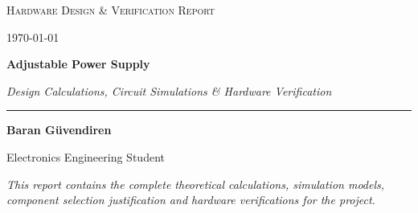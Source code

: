 \begin{titlepage}
    \centering
    
    \vspace*{3cm}
    {\scshape\Large Hardware Design \& Verification Report\par}
    {\small \today\par}

    \vspace{2.25cm}
    {\huge\bfseries Adjustable Power Supply\par}
    {\Large\itshape Design Calculations, Circuit Simulations \& Hardware Verification\par}
    \rule{\textwidth}{1.2pt}
    
    \vspace{3.5cm}
    {\large\bfseries Baran Güvendiren\par}
    {\small Electronics Engineering Student\par}

    \vfill
    \begin{minipage}{0.85\textwidth}
        \centering
        {\small\itshape This report contains the complete theoretical calculations, simulation models, component selection justification and hardware verifications for the project.\par}
    \end{minipage}
\end{titlepage}
\clearpage